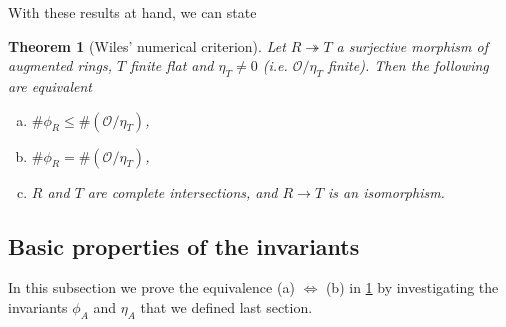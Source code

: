 \documentclass{article}
\theoremstyle{plain}%
\newtheorem{theorem}{Theorem}[section]
\theoremstyle{definition}
\theoremstyle{remark}
\begin{document}
With these results at hand, we can state 
\begin{theorem}[Wiles' numerical criterion]\label{thm:wiles_numerical_criterion}
    Let \(R \twoheadrightarrow T\) a surjective morphism of augmented rings, \(T\) finite flat and \(\eta_T \neq 0\) 
    (i.e. \(\mathcal{O}/\eta_T\) finite).
    Then the following are equivalent
    \begin{enumerate}[(a)]
        \item \(\# \phi_R \le \#(\mathcal{O}/\eta_T)\),
        \item \(\# \phi_R = \#(\mathcal{O}/\eta_T)\),
        \item \(R\) and \(T\) are complete intersections, and \(R \to T\) is an isomorphism.
    \end{enumerate}
\end{theorem}

\subsection{Basic properties of the invariants}
In this subsection we prove the equivalence (a) \(\Leftrightarrow\) (b) in \cref{thm:wiles_numerical_criterion}
by investigating the invariants \(\phi_A\) and \(\eta_A\) that we defined last section.
\end{document}

